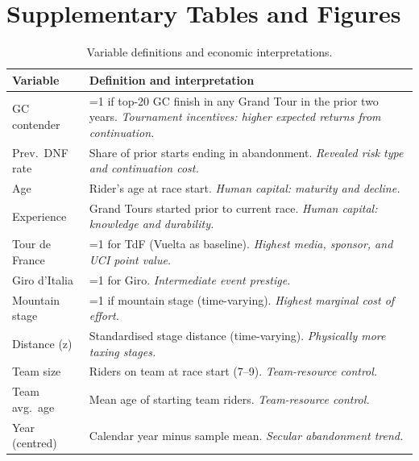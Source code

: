\appendix
\section{Supplementary Tables and Figures}
\label{sec:appendix}

\begin{table}[H]
\centering
\caption{Variable definitions and economic interpretations.}
\label{tab:variables}
\small
\renewcommand{\arraystretch}{1.3}
\begin{tabular}{@{} p{2.6cm} p{11cm} @{}}
\toprule
\textbf{Variable} & \textbf{Definition and interpretation} \\
\midrule
GC contender      & =1 if top-20 GC finish in any Grand Tour in the prior two years. \textit{Tournament incentives: higher expected returns from continuation.} \\
Prev.\ DNF rate   & Share of prior starts ending in abandonment. \textit{Revealed risk type and continuation cost.} \\
Age               & Rider's age at race start. \textit{Human capital: maturity and decline.} \\
Experience        & Grand Tours started prior to current race. \textit{Human capital: knowledge and durability.} \\
Tour de France    & =1 for TdF (Vuelta as baseline). \textit{Highest media, sponsor, and UCI point value.} \\
Giro d'Italia     & =1 for Giro. \textit{Intermediate event prestige.} \\
Mountain stage    & =1 if mountain stage (time-varying). \textit{Highest marginal cost of effort.} \\
Distance (z)      & Standardised stage distance (time-varying). \textit{Physically more taxing stages.} \\
Team size         & Riders on team at race start (7--9). \textit{Team-resource control.} \\
Team avg.\ age    & Mean age of starting team riders. \textit{Team-resource control.} \\
Year (centred)    & Calendar year minus sample mean. \textit{Secular abandonment trend.} \\
\bottomrule
\end{tabular}
\end{table}

